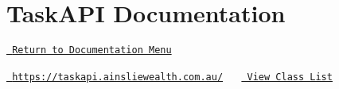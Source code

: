 \chapter{Task\+API Documentation}
\hypertarget{index}{}\label{index}
 \href{https://oscarmiike.github.io}{\texttt{ Return to Documentation Menu}} 

 \href{https://taskapi.ainsliewealth.com.au/}{\texttt{ https\+://taskapi.\+ainsliewealth.\+com.\+au/}}~\newline
~\newline
 \href{annotated.html}{\texttt{ View Class List}}  